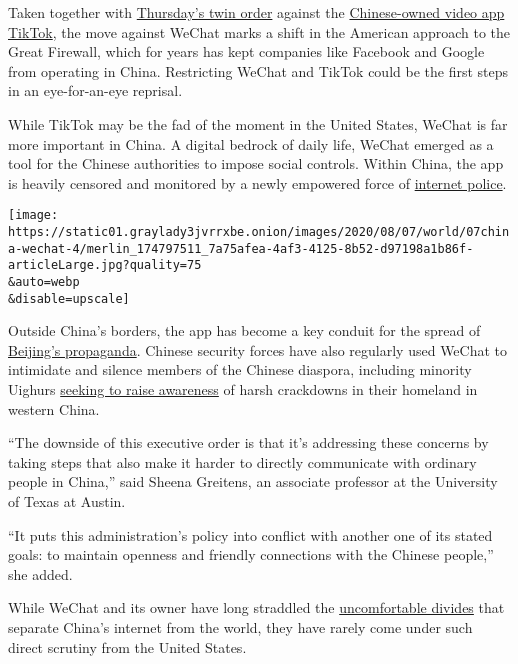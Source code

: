 Taken together with
\href{https://www.whitehouse.gov/presidential-actions/executive-order-addressing-threat-posed-tiktok/}{Thursday's
twin order} against the
\href{https://www.nytimes3xbfgragh.onion/2020/08/03/technology/tiktok-bytedance-us-china.html}{Chinese-owned
video app TikTok}, the move against WeChat marks a shift in the American
approach to the Great Firewall, which for years has kept companies like
Facebook and Google from operating in China. Restricting WeChat and
TikTok could be the first steps in an eye-for-an-eye reprisal.

While TikTok may be the fad of the moment in the United States, WeChat
is far more important in China. A digital bedrock of daily life, WeChat
emerged as a tool for the Chinese authorities to impose social controls.
Within China, the app is heavily censored and monitored by a newly
empowered force of
\href{https://www.nytimes3xbfgragh.onion/2020/03/16/business/china-coronavirus-internet-police.html}{internet
police}.

\texttt{[image: https://static01.graylady3jvrrxbe.onion/images/2020/08/07/world/07china-wechat-4/merlin\_174797511\_7a75afea-4af3-4125-8b52-d97198a1b86f-articleLarge.jpg?quality=75\\\&auto=webp\\\&disable=upscale]}

Outside China's borders, the app has become a key conduit for the spread
of
\href{https://www.nytimes3xbfgragh.onion/2018/03/02/technology/china-technology-censorship-borders-expansion.html}{Beijing's
propaganda}. Chinese security forces have also regularly used WeChat to
intimidate and silence members of the Chinese diaspora, including
minority Uighurs
\href{https://www.nytimes3xbfgragh.onion/2019/08/15/podcasts/the-daily/china-xinjiang-uighur-detention.html}{seeking
to raise awareness} of harsh crackdowns in their homeland in western
China.

``The downside of this executive order is that it's addressing these
concerns by taking steps that also make it harder to directly
communicate with ordinary people in China,'' said Sheena Greitens, an
associate professor at the University of Texas at Austin.

``It puts this administration's policy into conflict with another one of
its stated goals: to maintain openness and friendly connections with the
Chinese people,'' she added.

While WeChat and its owner have long straddled the
\href{https://www.nytimes3xbfgragh.onion/2017/09/17/technology/facebook-government-regulations.html}{uncomfortable
divides} that separate China's internet from the world, they have rarely
come under such direct scrutiny from the United States.


